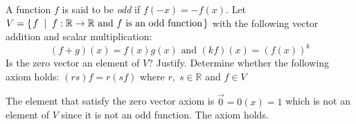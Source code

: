 
\begin{Exercise}[
name={},
title={}, 
difficulty=0,
origin={\cite{YL}}]
A function $f$ is said to be \emph{odd} if $f(-x)=-f(x)$.
Let $V=\mbox{$\left\{\hspace{0.1em}f\;\;\middle|\;\; f:\mathbb{R}\to\mathbb{R} \text{ and $f$ is an odd function}\hspace{0.1em}\right\}$}$ with the following vector addition and scalar multiplication:
\[
(f+g)(x)=f(x)g(x)
\text{ and } 
(kf)(x)
=
(f(x))^k
\]
\Question Is the zero vector an element of $V$? Justify.
\Question Determine whether the following axiom holds:
$(rs)f=r(sf)$ where $r,\;s\in\mathbb{R}$ and $f\in V$

\end{Exercise}

\begin{Answer}
\Question The element that satisfy the zero vector axiom is $\vec{0}=0(x)=1$ 
which is not an element of $V$ since it is not an odd function.
\Question The axiom holds.
\end{Answer}
